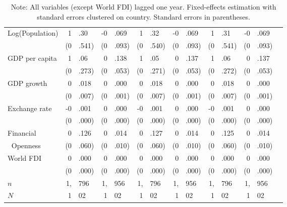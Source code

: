 \documentclass[12pt,onesided]{amsart}
\begin{document}
\begin{table}[ht]
{\begin{tabular}{lr@{} lr@{}lr@{}lr@{}lr@{}lr@{}lr@{} }
	\multirow{2}{*}{Log(Population)} & 1&.30 & -0&.069 & 1&.32 & -0&.069 & 1&.31 & -0&.069 \\
	& (0&.541) & (0&.093) & (0&.540) & (0&.093) & (0&.541) & (0&.093) \\
	\multirow{2}{*}{GDP per capita} & 1&.06 & 0&.138 & 1&.05 & 0&.137 & 1&.06 & 0&.137 \\
	& (0&.273) & (0&.053) & (0&.271) & (0&.053) & (0&.272) & (0&.053) \\
	\multirow{2}{*}{GDP growth} & 0&.018 & 0&.000 & 0&.018 & 0&.000 & 0&.018 & 0&.000 \\
	& (0&.007) & (0&.001) & (0&.007) & (0&.001) & (0&.007) &(0&.001) \\
	\multirow{2}{*}{Exchange rate} & -0&.001 & 0&.000 & -0&.001 & 0&.000 & -0&.001 & 0&.000 \\
	& (0&.000) & (0&.000) & (0&.000) & (0&.000) & (0&.000) &(0&.000) \\
	Financial & 0&.126 & 0&.014 & 0&.127 & 0&.014 & 0&.125 & 0&.014 \\
	$\;\;$Openness & (0&.060) & (0&.010) & (0&.060) & (0&.010) & (0&.060) &(0&.010) \\		
	\multirow{2}{*}{World FDI} & 0&.000 & 0&.000 & 0&.000 & 0&.000 & 0&.000 & 0&.000 \\
	& (0&.000) & (0&.000) & (0&.000) & (0&.000) & (0&.000) &(0&.000) \\ \hline
	$n$ & 1,&796 & 1,&956 & 1,&796 & 1,&956 & 1,&796 & 1,&956 \\
	$N$ & 1&02 & 1&02 & 1&02 & 1&02 & 1&02 & 1&02 \\
	\hline\hline
\end{tabular}
\caption*{Note: All variables (except World FDI) lagged one year. Fixed-effects estimation with standard errors clustered on country. Standard errors in parentheses. }
}
\end{table}
\FloatBarrier

\newpage
\end{document}
